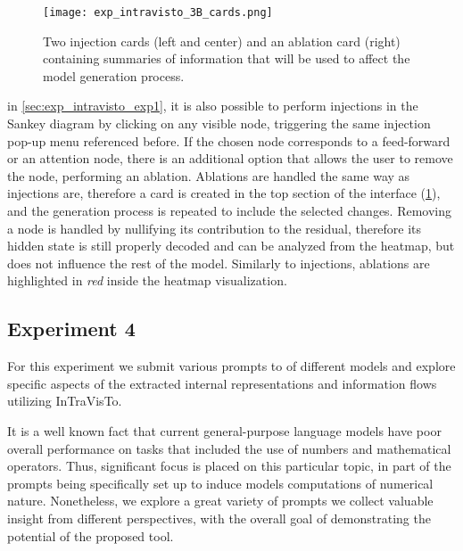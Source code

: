 \begin{figure}[t!]
    \centering
    \texttt{[image: exp\_intravisto\_3B\_cards.png]}
    \caption[Injection and ablation cards containing summaries of information that will be used to affect the model generation process.]{Two injection cards (left and center) and an ablation card (right) containing summaries of information that will be used to affect the model generation process.}
    \label{fig:exp_intravisto_3_B}
\end{figure}

 in \cref{sec:exp_intravisto_exp1}, it is also possible to perform injections in the Sankey diagram by clicking on any visible node, triggering the same injection pop-up menu referenced before.
If the chosen node corresponds to a feed-forward  or an attention node, there is an additional option that allows the user to remove the node, performing an ablation.
Ablations are handled the same way as injections are, therefore a card is created in the top section of the interface (\cref{fig:exp_intravisto_3_B}), and the generation process is repeated to include the selected changes.
Removing a node is handled by nullifying its contribution to the residual, therefore its hidden state is still properly decoded and can be analyzed from the heatmap, but does not influence the rest of the model.
Similarly to injections, ablations are highlighted in \emph{red} inside the heatmap visualization.

\subsection{Experiment 4}\label{sec:exp_intravisto_exp4}

For this experiment we submit various prompts to  of different models and explore specific aspects of the extracted internal representations and information flows utilizing InTraVisTo.

It is a well known fact that current general-purpose language models have  poor overall performance on tasks that included the use of numbers and mathematical operators.
Thus, significant focus is placed on this particular topic,  in part of the prompts being specifically set up to induce models  computations of numerical nature.
Nonetheless, we explore a great variety of prompts  we collect valuable insight from different perspectives, with the overall goal of demonstrating the potential of the proposed tool.

